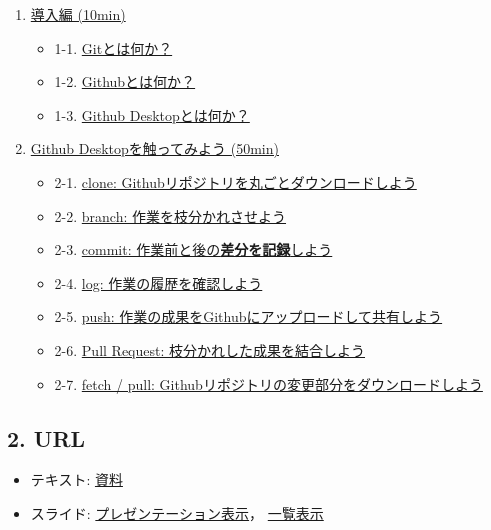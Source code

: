 \begin{enumerate}
\def\labelenumi{\arabic{enumi}.}
\tightlist
\item
  \href{./docs.md\#1-導入編}{導入編 (10min)}

  \begin{itemize}
  \tightlist
  \item
    1-1. \href{./docs.md/\#1-1-gitとは何か}{Gitとは何か？}
  \item
    1-2. \href{./docs.md/\#1-2-githubとは何か}{Githubとは何か？}
  \item
    1-3. \href{./docs.md/\#1-3-github-desktopとは何か}{Github
    Desktopとは何か？}
  \end{itemize}
\item
  \href{./docs.md\#2-github-desktopを触ってみよう}{Github
  Desktopを触ってみよう (50min)}

  \begin{itemize}
  \tightlist
  \item
    2-1.
    \href{./docs.md/\#2-1-clone-githubリポジトリを丸ごとダウンロードしよう}{clone:
    Githubリポジトリを丸ごとダウンロードしよう}
  \item
    2-2. \href{./docs.md\#2-2-branch-作業を枝分かれさせよう}{branch:
    作業を枝分かれさせよう}
  \item
    2-3.
    \href{./docs.md\#2-3-commit-作業前と後の差分を記録しよう}{commit:
    作業前と後の\textbf{差分を記録}しよう}
  \item
    2-4. \href{./docs.md\#2-4-log-作業の履歴を確認しよう}{log:
    作業の履歴を確認しよう}
  \item
    2-5.
    \href{./docs.md\#2-5-push-作業の成果をgithubにアップロードして共有しよう}{push:
    作業の成果をGithubにアップロードして共有しよう}
  \item
    2-6.
    \href{./docs.md\#2-6-pull-request-枝分かれした成果を結合しよう}{Pull
    Request: 枝分かれした成果を結合しよう}
  \item
    2-7.
    \href{./docs.md\#2-7-fetch--pull-githubリポジトリの変更部分をダウンロードしよう}{fetch
    / pull: Githubリポジトリの変更部分をダウンロードしよう}
  \end{itemize}
\end{enumerate}

\subsection{2. URL}\label{url}

\begin{itemize}
\tightlist
\item
  テキスト: \href{./docs.md}{資料}
\item
  スライド:
  \href{https://jigintern.github.io/intern-dev-tutorial/github-desktop-slide.html}{プレゼンテーション表示}，
  \href{https://jigintern.github.io/intern-dev-tutorial/github-desktop-slide.pdf}{一覧表示}
\end{itemize}
